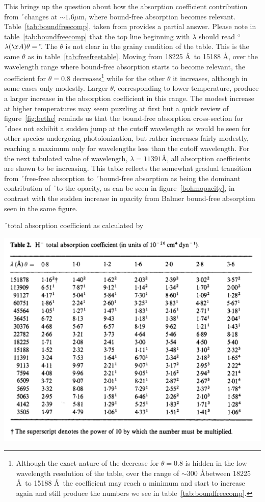 This brings up the question about how the absorption coefficient contribution from \h\ changes at $\sim 1.6 \mu$m, where bound-free absorption becomes relevant.  Table~\ref{tab:boundfreecomp}, taken from \cite{bell1975} provides a partial answer.  Please note in table~\ref{tab:boundfreecomp} that the top line beginning with $\lambda$ should read ``$\lambda(\AA)\theta=$''. The $\theta$ is not clear in the grainy rendition of the table.  This is the same $\theta$ as in table~\ref{tab:freefreetable}.  Moving from 18225 \AA\ to 15188 \AA, over the wavelength range where bound-free absorption starts to become relevant, the coefficient for $\theta=$0.8 decreases\footnote{Although the exact nature of the decrease for $\theta=$0.8 is hidden in the low wavelength resolution of the table, over the range of $\sim$300 \AA between 18225 \AA\ to 15188 \AA\ the coefficient may reach a minimum and start to increase again and still produce the numbers we see in table~\ref{tab:boundfreecomp}.} while for the other $\theta$ it increases, although in some cases only modestly. Larger $\theta$, corresponding to lower temperature, produce a larger increase in the absorption coefficient in this range.  The modest increase at higher temperatures may seem puzzling at first but a quick review of figure~\ref{fig:bethe} reminds us that the bound-free absorption cross-section for \h\ does not exhibit a sudden jump at the cutoff wavelength as would be seen for other species undergoing photoionization, but rather increases fairly modestly, reaching a maximum only for wavelengths less than the cutoff wavelength.  For the next tabulated value of wavelength, $\lambda=11391$\AA, all absorption coefficients are shown to be increasing.  This table reflects the somewhat gradual transition from \h\ free-free absorption to \h\ bound-free absorption as being the dominant contribution of \h\ to the opacity, as can be seen in figure~\ref{bohmopacity}, in contrast with the sudden increase in opacity from Balmer bound-free absorption seen in the same figure.
\begin{table}
\caption{\label{tab:boundfreecomp}\h\ total absorption coefficient as calculated by \cite{bell1975}}
\includegraphics[width=\linewidth]{figs/freeandboundtable.png}
\end{table}
